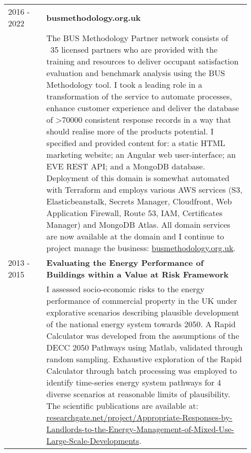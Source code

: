 \documentclass[11pt, oneside]{article}   	%
\begin{document}
\begin{table}[h]
\begin{center}
\begin{tabular}{p{0.15\linewidth} p{0.8\linewidth}}
2016 - 2022&\textbf{busmethodology.org.uk} \\
&The BUS Methodology Partner network consists of ~35 licensed partners who are provided with the training and resources to deliver occupant satisfaction evaluation and benchmark analysis using the BUS Methodology tool. I took a leading role in a transformation of the service to automate processes, enhance customer experience and deliver the database of >70000 consistent response records in a way that should realise more of the products potential. I specified and provided content for: a static HTML marketing website; an Angular web user-interface; an EVE REST API; and a MongoDB database. Deployment of this domain is somewhat automated with Terraform and employs various AWS services (S3, Elasticbeanstalk, Secrets Manager, Cloudfront, Web Application Firewall, Route 53, IAM, Certificates Manager) and MongoDB Atlas. All domain services are now available at the domain and I continue to project manage the business: \url{busmethodology.org.uk}. \\
2013 - 2015&\textbf{Evaluating the Energy Performance of Buildings within a Value at Risk Framework} \\
&I assessed socio-economic risks to the energy performance of commercial property in the UK under explorative scenarios describing plausible development of the national energy system towards 2050. A Rapid Calculator was developed from the assumptions of the DECC 2050 Pathways using Matlab, validated through random sampling. Exhaustive exploration of the Rapid Calculator through batch processing was employed to identify time-series energy system pathways for 4 diverse scenarios at reasonable limits of plausibility. The scientific publications are available at:
 \url{researchgate.net/project/Appropriate-Responses-by-Landlords-to-the-Energy-Management-of-Mixed-Use-Large-Scale-Developments}. \\
\hline
\end{tabular}
\end{center}
\vspace{-10mm}
\end{table}

\pagebreak
\end{document}
